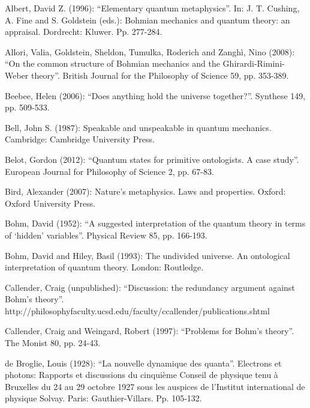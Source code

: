 \documentclass[12pt]{article}
\theoremstyle{definition}
\begin{document}
\small{
 \noindent  Albert, David Z. (1996): ``Elementary quantum metaphysics''. In: J. T. Cushing, A. Fine and S. Goldstein (eds.): Bohmian mechanics and quantum theory: an appraisal. Dordrecht: Kluwer. Pp. 277-284.

\vspace{0.3cm}   \noindent  Allori, Valia, Goldstein, Sheldon, Tumulka, Roderich and Zangh\`i, Nino (2008): ``On the common structure of Bohmian mechanics and the Ghirardi-Rimini-Weber theory''. British Journal for the Philosophy of Science 59, pp. 353-389.

\vspace{0.3cm}   \noindent  Beebee, Helen (2006): ``Does anything hold the universe together?''. Synthese 149, pp. 509-533. 
  
\vspace{0.3cm}   \noindent  Bell, John S. (1987): Speakable and unspeakable in quantum mechanics. Cambridge: Cambridge University Press. 

\vspace{0.3cm}   \noindent  Belot, Gordon (2012): ``Quantum states for primitive ontologists. A case study''. European Journal for Philosophy of Science 2, pp. 67-83. 

\vspace{0.3cm}   \noindent  Bird, Alexander (2007): Nature's metaphysics. Laws and properties. Oxford: Oxford University Press. 

\vspace{0.3cm}   \noindent  Bohm, David (1952): ``A suggested interpretation of the quantum theory in terms of `hidden' variables''. Physical Review 85, pp. 166-193. 

\vspace{0.3cm}   \noindent  Bohm, David and Hiley, Basil (1993): The undivided universe. An ontological interpretation of quantum theory. London: Routledge. 

\vspace{0.3cm}   \noindent  Callender, Craig (unpublished): ``Discussion: the redundancy argument against Bohm's theory''. \\
http://philosophyfaculty.ucsd.edu/faculty/ccallender/publications.shtml

\vspace{0.3cm}   \noindent  Callender, Craig and Weingard, Robert (1997): ``Problems for Bohm's theory''. The Monist 80, pp. 24-43.

\vspace{0.3cm}   \noindent  de Broglie, Louis (1928): ``La nouvelle dynamique des quanta''. Electrons et photons: Rapports et discussions du cinqui\`eme Conseil de physique tenu \`a Bruxelles du 24 au 29 octobre 1927 sous les auspices de l'Institut international de physique Solvay. Paris: Gauthier-Villars. Pp. 105-132. 

}
\end{document}
